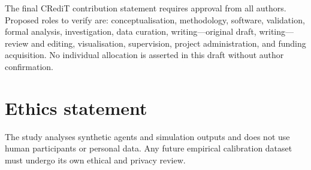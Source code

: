 The final CRediT contribution statement requires approval from all authors. Proposed roles to verify are: conceptualisation, methodology, software, validation, formal analysis, investigation, data curation, writing---original draft, writing---review and editing, visualisation, supervision, project administration, and funding acquisition. No individual allocation is asserted in this draft without author confirmation.

\section*{Ethics statement}

The study analyses synthetic agents and simulation outputs and does not use human participants or personal data. Any future empirical calibration dataset must undergo its own ethical and privacy review.

